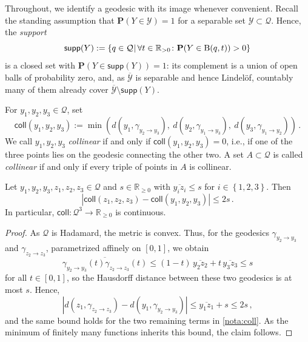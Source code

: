 \documentclass{article}
\newcommand*{\mc}[1]{\mathcal{#1}}
\newcommand*{\ms}[1]{\mathsf{#1}}
\newcommand{\R}{\mathbb{R}}
\newcommand{\Rp}{\R_{\geq0}}
\newcommand{\Rpp}{\R_{>0}}
\newcommand{\ball}{\mathrm{B}}
\newcommand{\lcb}{\left\lbrace} %
\newcommand{\rcb}{\right\rbrace} %
\newcommand{\cb}[1]{\lcb #1 \rcb} %
\newcommand{\lb}{\left(} %
\newcommand{\rb}{\right)} %
\newcommand{\br}[1]{\lb #1 \rb} %
\newcommand{\brOf}[1]{\!\br{#1}} %
\newcommand{\absOf}[1]{\left\vert #1 \right\vert} %
\renewcommand{\Pr}{\mathbf{P}} %
\newcommand{\Prof}[1]{\Pr(#1)}
\newcommand{\PrOf}[1]{\Pr\brOf{#1}}
\newcommand{\sizedMid}[2]{#1 \, \kern-\nulldelimiterspace\mathopen{}\left| \vphantom{#1}\,#2\right.\mathclose{}\kern-\nulldelimiterspace}
\newcommand{\setByEle}[2]{\cb{\sizedMid{#1}{#2}}}
\newcommand{\eqcm}{\,,} %
\newcommand{\eqfs}{\,.}
\newcommand{\ol}[2]{\overline{#1#2}}
\newcommand{\geodft}[2]{\gamma_{#1\to#2}} %
\newcommand{\ballopen}{\ball}
\newcommand{\collOf}[1]{\ms{coll}\brOf{#1}}
\newcommand{\suppof}[1]{\ms{supp}(#1)}
\begin{document}
Throughout, we identify a geodesic with its image whenever convenient. Recall the standing assumption that $\Prof{Y\in\mc Y} = 1$ for a separable set $\mc Y\subset\mc Q$. Hence, the \emph{support}
\begin{equation}
    \suppof Y := \setByEle{q\in\mc Q}{\forall t \in \Rpp\colon \PrOf{Y \in \ballopen(q, t)} > 0}
\end{equation}
is a closed set with $\Prof{Y\in\suppof Y} = 1$: its complement is a union of open balls of probability zero, and, as $\overline{\mc Y}$ is separable and hence Lindel\"of, countably many of them already cover $\overline{\mc Y}\setminus\suppof Y$.
%
\begin{notation}\label{nota:coll}
    For $y_1,y_2,y_3\in\mc Q$, set
    \begin{equation}
        \collOf{y_1,y_2,y_3}
        :=
        \min\brOf{d\brOf{y_1, \geodft{y_2}{y_3}},\ d\brOf{y_2, \geodft{y_1}{y_3}},\ d\brOf{y_3, \geodft{y_1}{y_2}}}
        \eqfs
    \end{equation}
    We call $y_1,y_2,y_3$ \emph{collinear} if and only if $\collOf{y_1,y_2,y_3} = 0$, i.e., if one of the three points lies on the geodesic connecting the other two. A set $A\subset\mc Q$ is called \emph{collinear} if and only if every triple of points in $A$ is collinear.
\end{notation}
%
\begin{lemma}\label{lmm:coll:lipschitz}
    Let $y_1,y_2,y_3,z_1,z_2,z_3\in\mc Q$ and $s\in\Rp$ with $\ol{y_i}{z_i}\leq s$ for $i\in\cb{1,2,3}$. Then
    \begin{equation}
        \absOf{\collOf{z_1,z_2,z_3} - \collOf{y_1,y_2,y_3}} \leq 2s
        \eqfs
    \end{equation}
    In particular, $\ms{coll}\colon\mc Q^3\to\Rp$ is continuous.
\end{lemma}
%
\begin{proof}
    As $\mc Q$ is Hadamard, the metric is convex. Thus, for the geodesics $\geodft{y_2}{y_3}$ and $\geodft{z_2}{z_3}$, parametrized affinely on $[0,1]$, we obtain
    \begin{equation}
        \ol{\geodft{y_2}{y_3}(t)}{\geodft{z_2}{z_3}(t)}
        \leq
        (1-t)\,\ol{y_2}{z_2} + t\,\ol{y_3}{z_3}
        \leq
        s
    \end{equation}
    for all $t\in[0,1]$, so the Hausdorff distance between these two geodesics is at most $s$. Hence,
    \begin{equation}
        \absOf{d\brOf{z_1,\geodft{z_2}{z_3}} - d\brOf{y_1,\geodft{y_2}{y_3}}}
        \leq
        \ol{y_1}{z_1} + s
        \leq
        2s
        \eqcm
    \end{equation}
    and the same bound holds for the two remaining terms in \cref{nota:coll}. As the minimum of finitely many functions inherits this bound, the claim follows.
\end{proof}
\end{document}
